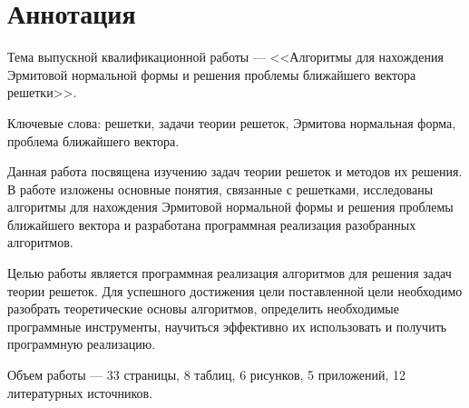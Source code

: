 \newpage
\setcounter{page}{2}

\section*{Аннотация}

Тема выпускной квалификационной работы --- <<Алгоритмы для нахождения Эрмитовой нормальной формы и решения проблемы ближайшего вектора решетки>>.

Ключевые слова: решетки, задачи теории решеток, Эрмитова нормальная форма, проблема ближайшего вектора.

Данная работа посвящена изучению задач теории решеток и методов их решения. В работе изложены основные понятия, связанные с решетками, исследованы алгоритмы для нахождения Эрмитовой нормальной формы и решения проблемы ближайшего вектора и разработана программная реализация разобранных алгоритмов.

Целью работы является программная реализация алгоритмов для решения задач теории решеток. Для успешного достижения цели поставленной цели необходимо разобрать теоретические основы алгоритмов, определить необходимые программные инструменты,  научиться эффективно их использовать и получить программную реализацию.

Объем работы --- 33 страницы, 8 таблиц, 6 рисунков, 5 приложений, 12 литературных источников.

\clearpage